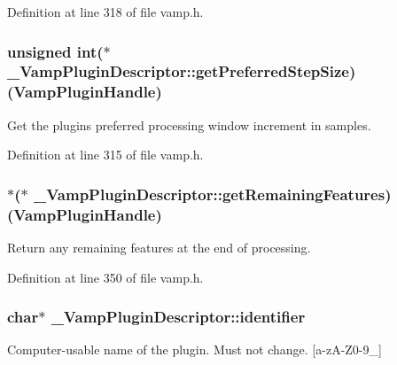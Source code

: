 Definition at line 318 of file vamp.\+h.

\subsubsection[{\texorpdfstring{get\+Preferred\+Step\+Size}{getPreferredStepSize}}]{\setlength{\rightskip}{0pt plus 5cm}unsigned {\bf int}($\ast$ \+\_\+\+Vamp\+Plugin\+Descriptor\+::get\+Preferred\+Step\+Size) ({\bf Vamp\+Plugin\+Handle})}\hypertarget{struct___vamp_plugin_descriptor_ae8efb5dec4a16b74fbb32ef36fc90e09}{}\label{struct___vamp_plugin_descriptor_ae8efb5dec4a16b74fbb32ef36fc90e09}
Get the plugin\textquotesingle{}s preferred processing window increment in samples. 

Definition at line 315 of file vamp.\+h.

\subsubsection[{\texorpdfstring{get\+Remaining\+Features}{getRemainingFeatures}}]{$\ast$($\ast$ \+\_\+\+Vamp\+Plugin\+Descriptor\+::get\+Remaining\+Features) ({\bf Vamp\+Plugin\+Handle})}\hypertarget{struct___vamp_plugin_descriptor_ad897b43458161a43cf6085198217d197}{}\label{struct___vamp_plugin_descriptor_ad897b43458161a43cf6085198217d197}
Return any remaining features at the end of processing. 

Definition at line 350 of file vamp.\+h.

\subsubsection[{\texorpdfstring{identifier}{identifier}}]{ char$\ast$ \+\_\+\+Vamp\+Plugin\+Descriptor\+::identifier}\hypertarget{struct___vamp_plugin_descriptor_a4915ec8276749cb505c01d25a6d02219}{}\label{struct___vamp_plugin_descriptor_a4915ec8276749cb505c01d25a6d02219}
Computer-\/usable name of the plugin. Must not change. \mbox{[}a-\/z\+A-\/\+Z0-\/9\+\_\+\mbox{]} 

